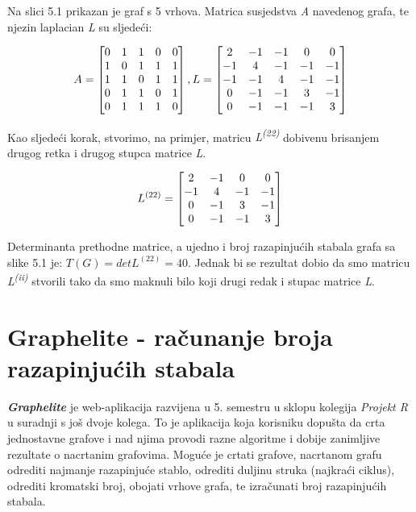 \documentclass[times, utf8, zavrsni]{fer}
\begin{document}
Na slici 5.1 prikazan je graf s 5 vrhova. Matrica susjedstva \textit{A} navedenog grafa, te njezin laplacian \textit{L} su sljedeći:

\[
\centering
A = 
\begin{bmatrix}
	0 & 1 & 1 & 0 & 0 \\
	1 & 0 & 1 & 1 & 1 \\
	1 & 1 & 0 & 1 & 1 \\
	0 & 1 & 1 & 0 & 1 \\
	0 & 1 & 1 & 1 & 0
\end{bmatrix}
,
L = 
\begin{bmatrix}
	2 & -1 & -1 & 0 & 0 \\
	-1 & 4 & -1 & -1 & -1 \\
	-1 & -1 & 4 & -1 & -1 \\
	0 & -1 & -1 & 3 & -1 \\
	0 & -1 & -1 & -1 & 3
\end{bmatrix}
\]

Kao sljedeći korak, stvorimo, na primjer, matricu \textit{L\textsuperscript{(22)}} dobivenu brisanjem drugog retka i drugog stupca matrice \textit{L}.

\[
\centering
L^{(22)} = 
\begin{bmatrix}
	2 & -1 & 0 & 0 \\
	-1 & 4 & -1 & -1 \\
	0 & -1 & 3 & -1 \\
	0 & -1 & -1 & 3
\end{bmatrix}
\]

Determinanta prethodne matrice, a ujedno i broj razapinjućih stabala grafa sa slike 5.1 je: $T(G) = det L^{(22)} = 40$. Jednak bi se rezultat dobio da smo matricu \textit{L\textsuperscript{(ii)}} stvorili tako da smo maknuli bilo koji drugi redak i stupac matrice \textit{L}.

\chapter{Graphelite - računanje broja razapinjućih stabala}

\textit{\textbf{Graphelite}} je web-aplikacija razvijena u 5. semestru u sklopu kolegija \textit{Projekt R} u suradnji s još dvoje kolega. To je aplikacija koja korisniku dopušta da crta jednostavne grafove i nad njima provodi razne algoritme i dobije zanimljive rezultate o nacrtanim grafovima. Moguće je crtati grafove, nacrtanom grafu odrediti najmanje razapinjuće stablo, odrediti duljinu struka (najkraći ciklus), odrediti kromatski broj, obojati vrhove grafa, te izračunati broj razapinjućih stabala.
\end{document}
